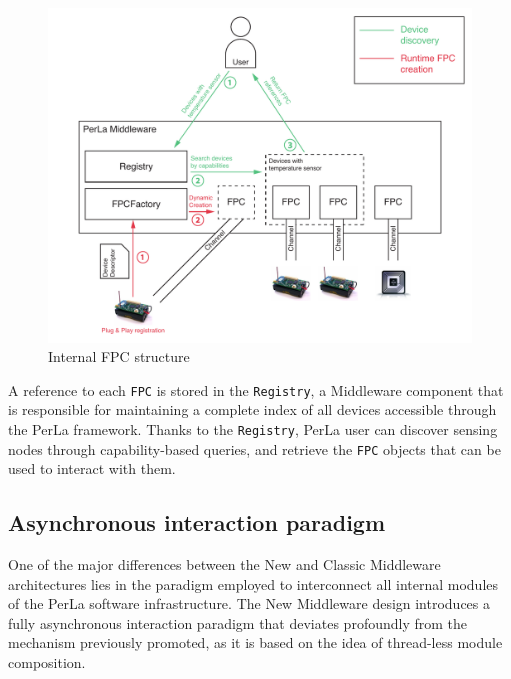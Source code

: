 \begin{figure}[h!]
\label{fig:fpc_overview}
\includegraphics[width=\textwidth]{imgs/middleware_overview.pdf}
\caption{Internal FPC structure}
\end{figure}

A reference to each \texttt{FPC} is stored in the \texttt{Registry}, a
Middleware component that is responsible for maintaining a complete index of
all devices accessible through the PerLa framework. Thanks to the
\texttt{Registry}, PerLa user can discover sensing nodes through
capability-based queries, and retrieve the \texttt{FPC} objects that can be
used to interact with them.

\subsection{Asynchronous interaction paradigm}
\label{sec:newmiddleware.async}

One of the major differences between the New and Classic Middleware
architectures lies in the paradigm employed to interconnect all internal
modules of the PerLa software infrastructure. The New Middleware design
introduces a fully asynchronous interaction paradigm that deviates profoundly
from the mechanism previously promoted, as it is based on the idea of
thread-less module composition.


